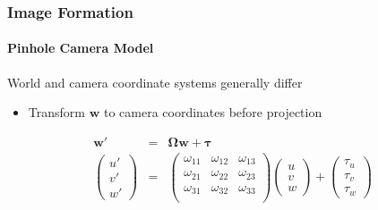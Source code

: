 \documentclass[xetex,professionalfont]{beamer}
\renewcommand{\vec}[1]{\ensuremath{\mathbf{#1}}}
\newcommand{\vw}{\vec{w}}
\begin{document}

\begin{frame}
\frametitle{Image Formation}
\framesubtitle{Pinhole Camera Model}

World and camera coordinate systems generally differ
\begin{itemize}
    \item Transform $\vw$ to camera coordinates before projection
\end{itemize}
\begin{eqnarray*}
    \vw' &=& \boldsymbol{\Omega}\vw + \boldsymbol{\tau} \\
    \begin{pmatrix}
        u' \\ v' \\ w'
    \end{pmatrix} &=&
    \begin{pmatrix}
        \omega_{11} & \omega_{12} & \omega_{13} \\
        \omega_{21} & \omega_{22} & \omega_{23} \\
        \omega_{31} & \omega_{32} & \omega_{33} \\
    \end{pmatrix}
    \begin{pmatrix}
        u \\ v \\ w
    \end{pmatrix} +
    \begin{pmatrix}
        \tau_u \\ \tau_v \\ \tau_w
    \end{pmatrix}
\end{eqnarray*}

\end{frame}

\end{document}
